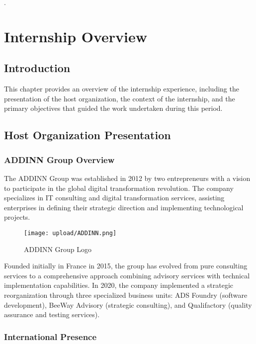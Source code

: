 \documentclass[12pt,a4paper]{report}
\begin{document}
.

\chapter{Internship Overview}

\section{Introduction}

This chapter provides an overview of the internship experience, including the presentation of the host organization, the context of the internship, and the primary objectives that guided the work undertaken during this period.

\section{Host Organization Presentation}

\subsection{ADDINN Group Overview}

The ADDINN Group was established in 2012 by two entrepreneurs with a vision to participate in the global digital transformation revolution. The company specializes in IT consulting and digital transformation services, assisting enterprises in defining their strategic direction and implementing technological projects.

\begin{figure}[H]
    \centering
    \texttt{[image: upload/ADDINN.png]}
    \caption{ADDINN Group Logo}
    \label{fig:addinn_logo}
\end{figure}

Founded initially in France in 2015, the group has evolved from pure consulting services to a comprehensive approach combining advisory services with technical implementation capabilities. In 2020, the company implemented a strategic reorganization through three specialized business units: ADS Foundry (software development), BeeWay Advisory (strategic consulting), and Qualifactory (quality assurance and testing services).

\subsection{International Presence}
\end{document}
